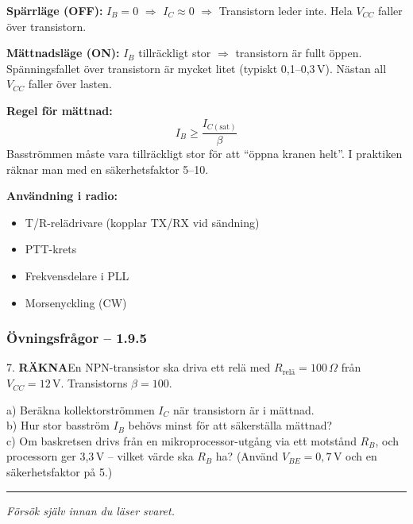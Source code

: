 \documentclass[a4paper,11pt,twoside]{book}
\newcommand{\emoji}[1]{{\emojifont #1}}
\newcommand{\qrakna}{\colorbox{bluepale}{\textcolor{bluedark}{\headingfont\bfseries\tiny RÄKNA}}}
\begin{document}
\begin{bluebox}[title={\emoji{🔑} Transistorn som switch -- två lägen}]
\textbf{Spärrläge (OFF):}
$I_B = 0$ $\Rightarrow$ $I_C \approx 0$ $\Rightarrow$
Transistorn leder inte. Hela $V_{CC}$ faller över transistorn.

\medskip
\textbf{Mättnadsläge (ON):}
$I_B$ tillräckligt stor $\Rightarrow$ transistorn är fullt
öppen. Spänningsfallet över transistorn är mycket litet
(typiskt 0,1--0,3\,V). Nästan all $V_{CC}$ faller över lasten.

\medskip
\textbf{Regel för mättnad:}
\[ I_B \geq \frac{I_{C(\text{sat})}}{\beta} \]
Basströmmen måste vara tillräckligt stor för att ``öppna kranen
helt''. I praktiken räknar man med en säkerhetsfaktor 5--10.

\medskip
\textbf{Användning i radio:}
\begin{itemize}
  \item T/R-relädrivare (kopplar TX/RX vid sändning)
  \item PTT-krets
  \item Frekvensdelare i PLL
  \item Morsenyckling (CW)
\end{itemize}
\end{bluebox}

\subsubsection*{Övningsfrågor -- 1.9.5}

\begin{qblock}{7.}
\qrakna\quad En NPN-transistor ska driva ett relä med
$R_{\text{relä}} = 100\,\Omega$ från $V_{CC} = 12\,\text{V}$.
Transistorns $\beta = 100$.

a) Beräkna kollektorströmmen $I_C$ när transistorn är
   i mättnad.\\
b) Hur stor basström $I_B$ behövs minst för att säkerställa
   mättnad?\\
c) Om baskretsen drivs från en mikroprocessor-utgång via ett
   motstånd $R_B$, och processorn ger 3,3\,V -- vilket värde
   ska $R_B$ ha? (Använd $V_{BE} = 0{,}7\,\text{V}$ och
   en säkerhetsfaktor på 5.)
\end{qblock}

\medskip
\noindent\rule{\textwidth}{0.4pt}
{\small\itshape Försök själv innan du läser svaret.}
\medskip
\end{document}
